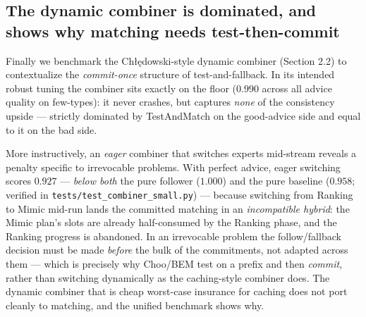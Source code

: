 \subsection{The dynamic combiner is dominated, and shows why matching
needs
test-then-commit}

Finally we benchmark the Chłędowski-style dynamic combiner (Section 2.2)
to contextualize the \emph{commit-once} structure of test-and-fallback.
In its intended robust tuning the combiner sits exactly on the floor
(\(0.990\) across all advice quality on few-types): it never crashes,
but captures \emph{none} of the consistency upside --- strictly
dominated by TestAndMatch on the good-advice side and equal to it on the
bad side.

More instructively, an \emph{eager} combiner that switches experts
mid-stream reveals a penalty specific to irrevocable problems. With
perfect advice, eager switching scores \(0.927\) --- \emph{below both}
the pure follower (\(1.000\)) and the pure baseline (\(0.958\); verified
in \texttt{tests/test\_combiner\_small.py}) --- because switching from
Ranking to Mimic mid-run lands the committed matching in an
\emph{incompatible hybrid}: the Mimic plan's slots are already
half-consumed by the Ranking phase, and the Ranking progress is
abandoned. In an irrevocable problem the follow/fallback decision must
be made \emph{before} the bulk of the commitments, not adapted across
them --- which is precisely why Choo/BEM test on a prefix and then
\emph{commit}, rather than switching dynamically as the caching-style
combiner does. The dynamic combiner that is cheap worst-case insurance
for caching does not port cleanly to matching, and the unified benchmark
shows why.
